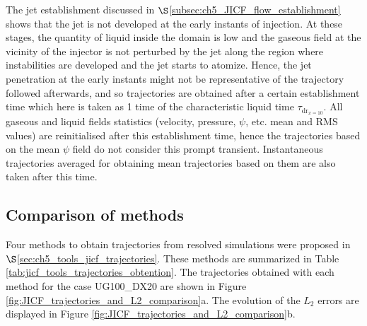 The jet establishment discussed in $\S$\ref{subsec:ch5_JICF_flow_establishment} shows that the jet is not developed at the early instants of injection. At these stages, the quantity of liquid inside the domain is low and the gaseous field at the vicinity of the injector is not perturbed by the jet along the region where instabilities are developed and the jet starts to atomize. Hence, the jet penetration at the early instants might not be representative of the trajectory followed afterwards, and so trajectories are obtained after a certain establishment time which here is taken as 1 time of the characteristic liquid time $\tau_{\mathrm{dr}_{x=10}}$. All gaseous and liquid fields statistics (velocity, pressure, $\psi$, etc. mean and RMS values) are reinitialised after this establishment time, hence the trajectories based on the mean $\psi$ field do not consider this prompt transient. Instantaneous trajectories averaged for obtaining mean trajectories based on them are also taken after this time.

\clearpage


\subsection{Comparison of methods}

Four methods to obtain trajectories from resolved simulations were proposed in $\S$\ref{sec:ch5_tools_jicf_trajectories}. These methods are summarized in Table \ref{tab:jicf_tools_trajectories_obtention}. The trajectories obtained with each method for the case UG100\_DX20 are shown in Figure \ref{fig:JICF_trajectories_and_L2_comparison}a. The evolution of the $L_2$ errors are displayed in Figure \ref{fig:JICF_trajectories_and_L2_comparison}b.

